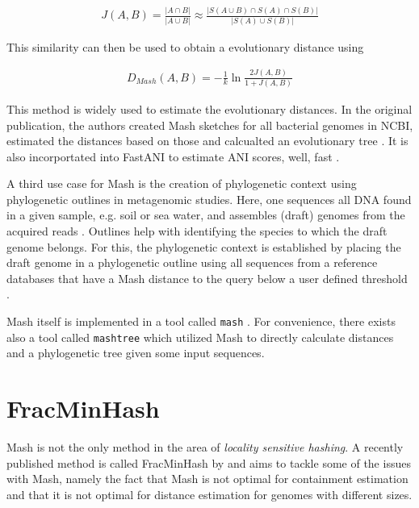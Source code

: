 \begin{align}
  J(A, B) = \frac{|A \cap B|}{|A \cup B|} \approx \frac{|S(A \cup B) \cap S(A) \cap S(B)|}{|S(A) \cup S(B)|}
\end{align}

This similarity can then be used to obtain a evolutionary distance using

\begin{align}
  D_{Mash}(A,B) = -\frac{1}{k}\ln{\frac{2J(A,B)}{1+J(A,B)}}
\end{align}

This method is widely used to estimate the evolutionary distances. In the
original publication, the authors created Mash sketches for all bacterial
 genomes in NCBI, estimated the
distances based on those and calcualted an evolutionary tree
\cite{ondovMashFastGenome2016}. It is also incorportated into FastANI to
estimate ANI scores, well, fast \cite{jainHighThroughputANI2018}.

A third use case for Mash is the creation of phylogenetic context using
phylogenetic outlines \cite{bagciMicrobialPhylogeneticContext2021} in
metagenomic studies. Here, one sequences all DNA found in a given sample, e.g.
soil or sea water, and assembles (draft) genomes from the acquired reads
\cite{kuninBioinformaticianGuideMetagenomics2008}. Outlines help with
identifying the species to which the draft genome belongs. For this, the
phylogenetic context is established by placing the draft genome in a
phylogenetic outline using all sequences from a reference databases that have a
Mash distance to the query below a user defined threshold
\cite{bagciMicrobialPhylogeneticContext2021}.

Mash itself is implemented in a tool called \texttt{mash}
\cite{ondovMashFastGenome2016}. For convenience, there exists also a tool called
\texttt{mashtree} \cite{katzMashtreeRapidComparison2019} which utilized Mash to
directly calculate distances and a phylogenetic tree given some input sequences.

\section{FracMinHash}
Mash is not the only method in the area of \textit{locality sensitive hashing}.
A recently published method is called FracMinHash by
\cite{irberLightweightCompositionalAnalysis2022} and aims to tackle some of the
issues with Mash, namely the fact that Mash is not optimal for containment
estimation and that it is not optimal for distance estimation for genomes with
different sizes.

